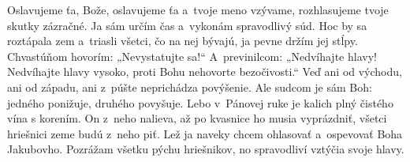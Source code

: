 Oslavujeme ťa, Bože,
oslavujeme ťa a~tvoje meno vzývame,
\versseparator
rozhlasujeme tvoje skutky zázračné.
Ja sám určím čas
a~vykonám spravodlivý súd.
\versseparator
Hoc by sa roztápala zem a~triasli všetci, čo na nej bývajú,
ja pevne držím jej stĺpy.
\versseparator
Chvastúňom hovorím: „Nevystatujte sa!“
A~previnilcom: „Nedvíhajte hlavy!
\versseparator
Nedvíhajte hlavy vysoko,
proti Bohu nehovorte bezočivosti.“
\versseparator
Veď ani od východu, ani od západu,
ani z~púšte neprichádza povýšenie.
Ale sudcom je sám Boh:
\versseparator
jedného ponižuje, druhého povyšuje.
Lebo v~Pánovej ruke je kalich
plný čistého vína s korením.
\versseparator
On z~neho nalieva,
až po kvasnice ho musia vyprázdniť,
všetci hriešnici zeme budú z~neho piť.
\versseparator
Lež ja naveky chcem ohlasovať
a~ospevovať Boha Jakubovho.
\versseparator
Pozrážam všetku pýchu hriešnikov,
no spravodliví vztýčia svoje hlavy.